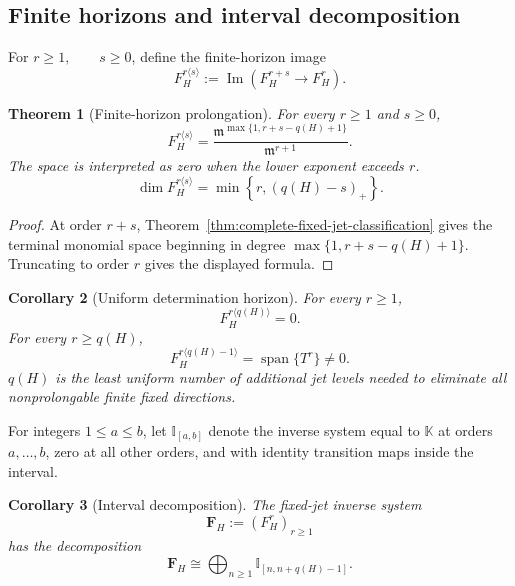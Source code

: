 \documentclass[11pt]{article}
\theoremstyle{plain}
\newtheorem{theorem}{Theorem}[section]
\newtheorem{corollary}[theorem]{Corollary}
\theoremstyle{definition}
\begin{document}
\subsection{Finite horizons and interval decomposition}
\label{subsec:finite-horizon}

For
\(r\geq1, \qquad s\geq0\),
define the finite-horizon image
\[
  F_H^{r\langle s\rangle}
  :=
  \operatorname{Im}
  \left(
    F_H^{r+s}
    \longrightarrow
    F_H^r
  \right).
\]

\begin{theorem}[Finite-horizon prolongation]
\label{thm:finite-horizon-prolongation}
For every \(r\geq1\) and \(s\geq0\),
\[
  \boxed{
  F_H^{r\langle s\rangle}
  =
  \frac{
    \mathfrak m^{
      \max\{1,r+s-q(H)+1\}
    }
  }{
    \mathfrak m^{r+1}
  }.
  }
\]
The space is interpreted as zero when the lower exponent exceeds \(r\).
\[
  \boxed{
  \dim F_H^{r\langle s\rangle}
  =
  \min
  \left\{
    r,
    (q(H)-s)_+
  \right\}.
  }
\]
\end{theorem}

\begin{proof}
At order \(r+s\),
Theorem~\ref{thm:complete-fixed-jet-classification}
gives the terminal monomial space beginning in degree
\(\max\{1,r+s-q(H)+1\}\).
Truncating to order \(r\) gives the displayed formula.
\end{proof}

\begin{corollary}[Uniform determination horizon]
\label{cor:uniform-determination-horizon}
For every \(r\geq1\),
\[
  F_H^{r\langle q(H)\rangle}=0.
\]
For every \(r\geq q(H)\),
\[
  F_H^{r\langle q(H)-1\rangle}
  =
  \operatorname{span}\{T^r\}
  \neq0.
\]
\(q(H)\) is the least uniform number of additional jet levels
needed to eliminate all nonprolongable finite fixed directions.
\end{corollary}

For integers
\(1\leq a\leq b\),
let \(\mathbb I_{[a,b]}\) denote the inverse system equal to \(\mathbb K\) at orders
\(a,\ldots,b\), zero at all other orders, and with identity transition
maps inside the interval.

\begin{corollary}[Interval decomposition]
\label{cor:interval-decomposition}
The fixed-jet inverse system
\[
  \mathbf F_H
  :=
  \left(
    F_H^r
  \right)_{r\geq1}
\]
has the decomposition
\[
  \boxed{
  \mathbf F_H
  \cong
  \bigoplus_{n\geq1}
  \mathbb I_{[n,n+q(H)-1]}.
  }
\]
\end{corollary}
\end{document}
